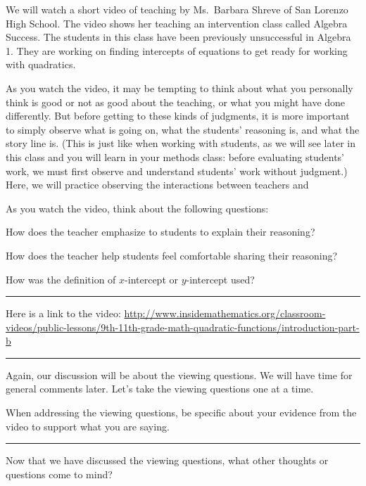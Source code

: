 \documentclass[11pt]{article}
\newenvironment{task}
	{\begin{mdframed}[linecolor=lightgray, linewidth=3pt]\raggedright}
	{\end{mdframed}}
\theoremstyle{definition}
\begin{document}
\begin{task}
We will watch a short video of teaching by Ms.~Barbara Shreve of San Lorenzo High School. The video shows her teaching an intervention class called Algebra Success. The students in this class have been previously unsuccessful in Algebra 1. They are working on finding intercepts of equations to get ready for working with quadratics. 

As you watch the video, it may be tempting to think about what you personally think is good or not as good about the teaching, or what you might have done differently. But before getting to these kinds of judgments, it is more important to simply observe what is going on, what the students' reasoning is, and what the story line is. (This is just like when working with students, as we will see later in this class and you will learn in your methods class: before evaluating students' work, we must first observe and understand students' work without judgment.) Here, we will practice observing the interactions between teachers and 

As you watch the video, think about the following questions:
	\begin{itemize*}
	\item How does the teacher emphasize to students to explain their reasoning?
	\item How does the teacher help students feel comfortable sharing their reasoning?
	\item How was the definition of $x$-intercept or $y$-intercept used?
	\end{itemize*}
	
\hrule 
\vspace*{2pt}

Here is a link to the video:
\url{http://www.insidemathematics.org/classroom-videos/public-lessons/9th-11th-grade-math-quadratic-functions/introduction-part-b}

\vspace*{2pt}
\hrule
\vspace*{2pt}

Again, our discussion will be about the viewing questions. We will have time for general comments later.  Let's take the viewing questions one at a time.

When addressing the viewing questions, be specific about your evidence from the video to support what you are saying.

\vspace*{2pt}
\hrule
\vspace*{2pt}

Now that we have discussed the viewing questions, what other thoughts or questions come to mind?
\end{task}
\end{document}
